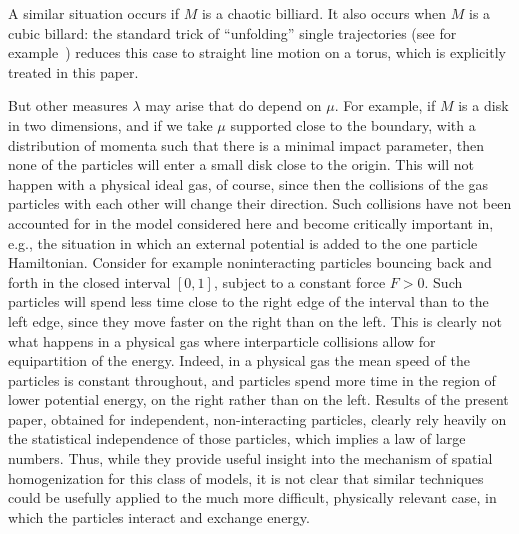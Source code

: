 \documentclass{article}
\numberwithin{equation}{section}
\begin{document}
A similar situation occurs if $M$ is a chaotic billiard. It also occurs when $M$ is a cubic billard: the standard trick of ``unfolding'' single trajectories (see for example~\cite{Be10}) reduces this case to straight line motion on a torus, which is explicitly treated in this paper.

But other measures $\lambda$ may arise that do depend on $\mu$. For example, if $M$ is a disk in two dimensions, and if we take $\mu$ supported close to the boundary, with a distribution of momenta such that there is a minimal impact parameter, then none of the particles will enter a small disk close to the origin. This will not happen with a physical ideal gas, of course, since then the collisions of the gas particles with each other will change their direction. Such collisions have not been accounted for in the model considered here and become critically important in, e.g., the situation in which an external potential is added to the one particle Hamiltonian. Consider for example noninteracting particles bouncing back and forth in the closed interval $[0,1]$, subject to a constant force $F>0$. Such particles will spend less time close to the right edge of the interval than to the left edge, since they move faster on the right than on the left. This is clearly not what happens in a physical gas where interparticle collisions allow for equipartition of the energy. Indeed, in a physical gas
the mean speed of the particles is constant throughout, and particles spend more time in the region of lower potential energy, on the right rather than on the left. Results of the present paper, obtained for independent, non-interacting particles, clearly rely heavily on the statistical independence of those particles, which implies a law of large numbers. Thus, while they provide useful insight into the mechanism of spatial homogenization for this class of models, it is not clear that similar techniques could be usefully applied to the much more difficult, physically relevant case, in which the particles interact and exchange energy.



\end{document}
